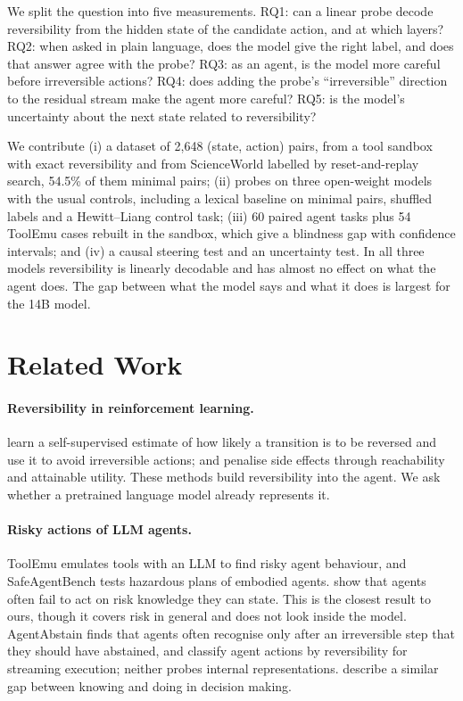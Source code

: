 \documentclass[11pt]{article}
\begin{document}
We split the question into five measurements. RQ1: can a linear probe decode reversibility from the hidden state of the candidate action, and at which layers? RQ2: when asked in plain language, does the model give the right label, and does that answer agree with the probe? RQ3: as an agent, is the model more careful before irreversible actions? RQ4: does adding the probe's ``irreversible'' direction to the residual stream make the agent more careful? RQ5: is the model's uncertainty about the next state related to reversibility?

We contribute (i) a dataset of 2,648 (state, action) pairs, from a tool sandbox with exact reversibility and from ScienceWorld labelled by reset-and-replay search, 54.5\% of them minimal pairs; (ii) probes on three open-weight models with the usual controls, including a lexical baseline on minimal pairs, shuffled labels and a Hewitt--Liang control task; (iii) 60 paired agent tasks plus 54 ToolEmu cases rebuilt in the sandbox, which give a blindness gap with confidence intervals; and (iv) a causal steering test and an uncertainty test. In all three models reversibility is linearly decodable and has almost no effect on what the agent does. The gap between what the model says and what it does is largest for the 14B model.

\section{Related Work}

\paragraph{Reversibility in reinforcement learning.} \citet{grinsztajn2021turning} learn a self-supervised estimate of how likely a transition is to be reversed and use it to avoid irreversible actions; \citet{krakovna2018penalizing} and \citet{turner2020conservative} penalise side effects through reachability and attainable utility. These methods build reversibility into the agent. We ask whether a pretrained language model already represents it.

\paragraph{Risky actions of LLM agents.} ToolEmu \citep{ruan2024toolemu} emulates tools with an LLM to find risky agent behaviour, and SafeAgentBench \citep{yin2024safeagentbench} tests hazardous plans of embodied agents. \citet{tang2025risk} show that agents often fail to act on risk knowledge they can state. This is the closest result to ours, though it covers risk in general and does not look inside the model. AgentAbstain \citep{liu2026agentabstain} finds that agents often recognise only after an irreversible step that they should have abstained, and \citet{zhai2026revisable} classify agent actions by reversibility for streaming execution; neither probes internal representations. \citet{schmied2026greedy} describe a similar gap between knowing and doing in decision making.
\end{document}

